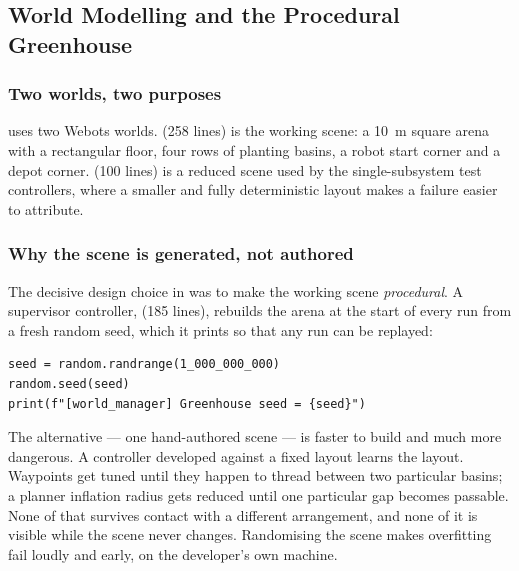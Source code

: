 \subsection{World Modelling and the Procedural Greenhouse}
\label{sec:phaseA_world}

\subsubsection{Two worlds, two purposes}

\phaseA{} uses two Webots worlds. 
(258 lines) is the working scene: a \SI{10}{m} square arena with a
rectangular floor, four rows of planting basins, a robot start corner
and a depot corner.  (100 lines) is a reduced
scene used by the single-subsystem test controllers, where a smaller and
fully deterministic layout makes a failure easier to attribute.

\subsubsection{Why the scene is generated, not authored}

The decisive design choice in \phaseA{} was to make the working scene
\emph{procedural}. A supervisor controller,
 (185 lines), rebuilds the arena at the
start of every run from a fresh random seed, which it prints so that any
run can be replayed:

\begin{lstlisting}[style=python]
seed = random.randrange(1_000_000_000)
random.seed(seed)
print(f"[world_manager] Greenhouse seed = {seed}")
\end{lstlisting}

The alternative --- one hand-authored scene --- is faster to build and
much more dangerous. A controller developed against a fixed layout
learns the layout. Waypoints get tuned until they happen to thread
between two particular basins; a planner inflation radius gets reduced
until one particular gap becomes passable. None of that survives contact
with a different arrangement, and none of it is visible while the scene
never changes. Randomising the scene makes overfitting fail loudly and
early, on the developer's own machine.

